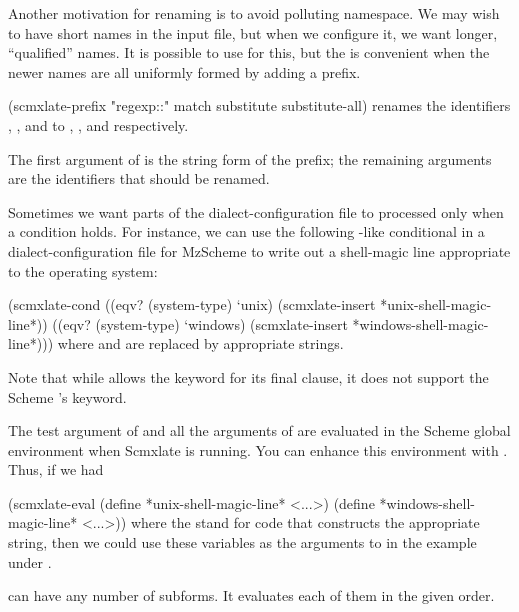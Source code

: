 Another motivation for renaming is to avoid polluting
namespace.  We may wish to have short names in the
input file, but when we configure it, we want longer,
“qualified” names.  It is possible to use
 for this, but the
 is convenient when the newer names
are all uniformly formed by adding a prefix.

\begintts
(scmxlate-prefix
  "regexp::"
  match
  substitute
  substitute-all)
\endtt
renames the identifiers , ,
and  to
, , and
 respectively.

The first argument of  is the
string form of the prefix; the remaining arguments are
the identifiers that should be renamed.


Sometimes we want parts of the dialect-configuration
file to processed only when a condition holds.  For
instance, we can use the following -like
conditional in
a dialect-configuration file for MzScheme to
write out a  shell-magic
line appropriate to the operating system:

\begintts
(scmxlate-cond
  ((eqv? (system-type) ‘unix)
   (scmxlate-insert *unix-shell-magic-line*))
  ((eqv? (system-type) ‘windows)
   (scmxlate-insert *windows-shell-magic-line*)))
\endtt
where  and
 are replaced by
appropriate strings.

Note that while  allows the 
keyword for its final clause, it does not support the
Scheme ’s \q{=>} keyword.


The test argument of  and all the
arguments of  are evaluated in the
Scheme global environment when Scmxlate is running.
You can enhance this environment with
.  Thus, if we had

\begintts
(scmxlate-eval
  (define *unix-shell-magic-line* <...>)
  (define *windows-shell-magic-line* <...>))
\endtt
where the  stand for code that constructs
the appropriate string, then we could use these
variables as the arguments to  in
the example under .

 can have any number of subforms.
It evaluates each of them in the given order.


